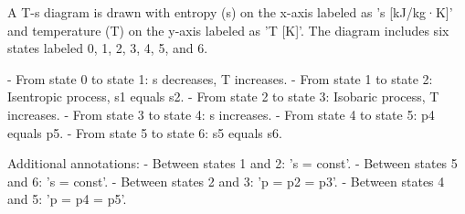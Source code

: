 A T-s diagram is drawn with entropy (s) on the x-axis labeled as 's [kJ/kg·K]' and temperature (T) on the y-axis labeled as 'T [K]'. The diagram includes six states labeled 0, 1, 2, 3, 4, 5, and 6.  

- From state 0 to state 1: s decreases, T increases.  
- From state 1 to state 2: Isentropic process, s1 equals s2.  
- From state 2 to state 3: Isobaric process, T increases.  
- From state 3 to state 4: s increases.  
- From state 4 to state 5: p4 equals p5.  
- From state 5 to state 6: s5 equals s6.  

Additional annotations:  
- Between states 1 and 2: 's = const'.  
- Between states 5 and 6: 's = const'.  
- Between states 2 and 3: 'p = p2 = p3'.  
- Between states 4 and 5: 'p = p4 = p5'.